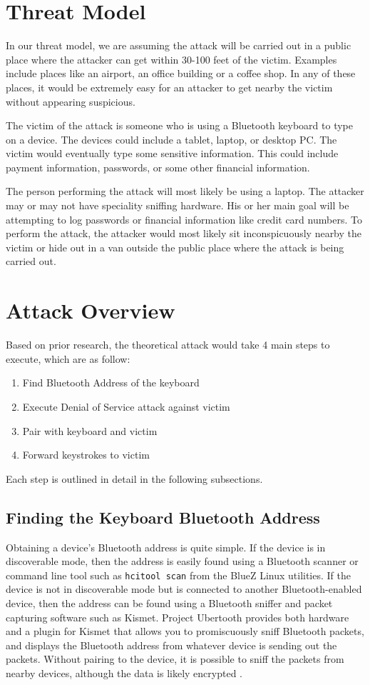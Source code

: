 \documentclass{acm_proc_article-sp}
\begin{document}
\section{Threat Model}
In our threat model, we are assuming the attack will be carried out in a public place where the attacker
can get within 30-100 feet of the victim. Examples include places like an airport, an office building or a coffee shop. In any of these places, it would be extremely easy for an attacker to get nearby the victim without appearing suspicious.

The victim of the attack is someone who is using a Bluetooth keyboard to type on a device. The devices could include a tablet, laptop, or desktop PC. The victim would eventually type some sensitive information. This could include payment information, passwords, or some other financial information. 

The person performing the attack will most likely be using a laptop. The attacker may or may not have speciality sniffing hardware. His or her main goal will be attempting to log passwords or financial information like credit card numbers. To perform the attack, the attacker would most likely sit inconspicuously nearby the victim or hide out in a van outside the public place where the attack is being carried out.

\section{Attack Overview}
Based on prior research, the theoretical attack would take 4 main steps to execute, which are as follow:
\begin{enumerate}
\item Find Bluetooth Address of the keyboard
\item Execute Denial of Service attack against victim
\item Pair with keyboard and victim
\item Forward keystrokes to victim
\end{enumerate}

Each step is outlined in detail in the following subsections.

\subsection{Finding the Keyboard Bluetooth Address}
Obtaining a device's Bluetooth address is quite simple. If the device is in discoverable mode, then the address is easily found using a Bluetooth scanner or command line tool such as \texttt{hcitool scan} from the BlueZ Linux utilities. If the device is not in discoverable mode but is connected to another Bluetooth-enabled device, then the address can be found using a Bluetooth sniffer and packet capturing software such as Kismet\cite{kismet}. Project Ubertooth \cite{ubertooth} provides both hardware and a plugin for Kismet that allows you to promiscuously sniff Bluetooth packets, and displays the Bluetooth address from whatever device is sending out the packets. Without pairing to the device, it is possible to sniff the packets from nearby devices, although the data is likely encrypted \cite{hak5}. 
\end{document}
